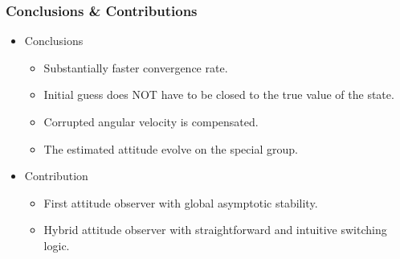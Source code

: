 \begin{frame} %
\frametitle{Conclusions \& Contributions}
\begin{itemize} 
\item Conclusions
	\begin{itemize} 
	\item Substantially faster convergence rate.
	\vspace*{0.15cm}
	\item Initial guess does NOT have to be closed to the true value of the state. 	
	\vspace*{0.15cm} 
	\item Corrupted angular velocity is compensated.
	\vspace*{0.15cm}
	\item The estimated attitude evolve on the special group.
	\end{itemize} 
\vspace*{0.3cm}
\pause
\item Contribution
	\begin{itemize} 
	\item First attitude observer with global asymptotic stability.
	\vspace*{0.15cm} 
	\item Hybrid attitude observer with straightforward and intuitive switching logic.
	\end{itemize}  
\end{itemize} 
\vspace*{0.6cm}
\end{frame}   %



